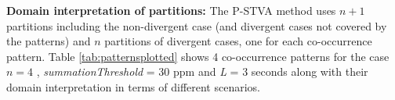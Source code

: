 \documentclass[letterpaper]{article} %
\begin{document}
\textbf{Domain interpretation of partitions:} The P-STVA method uses $n+1$ partitions including the non-divergent case (and divergent cases not covered by the patterns) and $n$ partitions of divergent cases, one for each co-occurrence pattern. Table \ref{tab:patternsplotted} shows 4 co-occurrence patterns for the case $n=4$ , \textit{summationThreshold} = 30 ppm and \textit{L} = 3 seconds along with their domain interpretation in terms of different scenarios. 


\end{document}
